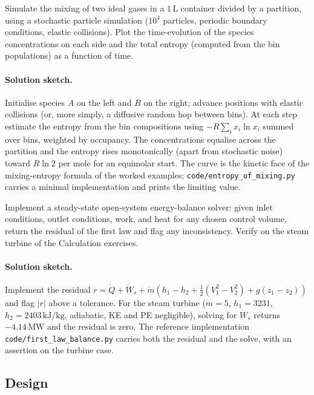 \begin{exercise}
Simulate the mixing of two ideal gases in a $1\,\text{L}$ container
divided by a partition, using a stochastic particle simulation
($10^4$ particles, periodic boundary conditions, elastic collisions).
Plot the time-evolution of the species concentrations on each side and
the total entropy (computed from the bin populations) as a function
of time.
\paragraph{Solution sketch.} Initialise species $A$ on the left and
$B$ on the right; advance positions with elastic collisions (or, more
simply, a diffusive random hop between bins). At each step estimate the
entropy from the bin compositions using $-R\sum_i x_i\ln x_i$ summed
over bins, weighted by occupancy. The concentrations equalise across
the partition and the entropy rises monotonically (apart from
stochastic noise) toward $R\ln 2$ per mole for an equimolar start. The
curve is the kinetic face of the mixing-entropy formula of the worked
examples; \texttt{code/entropy\_of\_mixing.py} carries a minimal
implementation and prints the limiting value.
\end{exercise}

\begin{exercise}
Implement a steady-state open-system energy-balance solver: given
inlet conditions, outlet conditions, work, and heat for any chosen
control volume, return the residual of the first law and flag any
inconsistency. Verify on the steam turbine of the Calculation
exercises.
\paragraph{Solution sketch.} Implement the residual
$r = \dot{Q} + \dot{W}_s + \dot{m}(h_1 - h_2 + \tfrac12(V_1^2 - V_2^2)
+ g(z_1 - z_2))$ and flag $|r|$ above a tolerance. For the steam
turbine ($\dot{m} = 5$, $h_1 = 3231$, $h_2 = 2403\,\text{kJ}/\text{kg}$,
adiabatic, KE and PE negligible), solving for $\dot{W}_s$ returns
$-4.14\,\text{MW}$ and the residual is zero. The reference
implementation \texttt{code/first\_law\_balance.py} carries both the
residual and the solve, with an assertion on the turbine case.
\end{exercise}

\subsection*{Design}

